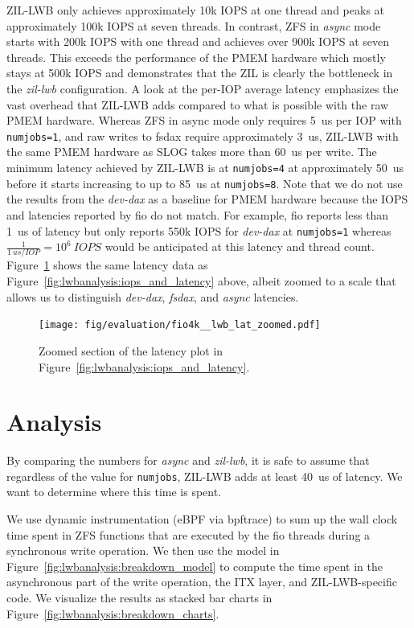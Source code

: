 \documentclass[12pt,a4paper,twoside]{book}
\begin{document}
ZIL-LWB only achieves approximately 10k IOPS at one thread and peaks at approximately 100k IOPS at seven threads.
In contrast, ZFS in \textit{async} mode starts with 200k IOPS with one thread and achieves over 900k IOPS at seven threads.
This exceeds the performance of the PMEM hardware which mostly stays at 500k IOPS and demonstrates that the ZIL is clearly the bottleneck in the \textit{zil-lwb} configuration.
A look at the per-IOP average latency emphasizes the vast overhead that ZIL-LWB adds compared to what is possible with the raw PMEM hardware.
Whereas ZFS in async mode only requires 5~us per IOP with \lstinline{numjobs=1}, and raw writes to fsdax require approximately 3~us, ZIL-LWB with the same PMEM hardware as SLOG takes more than 60~us per write.
The minimum latency achieved by ZIL-LWB is at \lstinline{numjobs=4} at approximately 50~us before it starts increasing to up to 85~us at \lstinline{numjobs=8}.
Note that we do not use the results from the \textit{dev-dax} as a baseline for PMEM hardware because the IOPS and latencies reported by fio do not match.
For example, fio reports less than 1~us of latency but only reports 550k IOPS for \textit{dev-dax} at \lstinline{numjobs=1} whereas $\frac{1}{1~us/IOP} = 10^6~\si{IOPS}$ would be anticipated at this latency and thread count.
Figure~\ref{fig:lwbanalysis:zoomed_latency} shows the same latency data as Figure~\ref{fig:lwbanalysis:iops_and_latency} above, albeit zoomed to a scale that allows us to distinguish \textit{dev-dax}, \textit{fsdax}, and \textit{async} latencies.

\begin{figure}[H]
    \centering
    \texttt{[image: fig/evaluation/fio4k\_\_lwb\_lat\_zoomed.pdf]}
    \caption{Zoomed section of the latency plot in Figure~\ref{fig:lwbanalysis:iops_and_latency}.}
    \label{fig:lwbanalysis:zoomed_latency}
\end{figure}

\section{Analysis}\label{ch:lwb_analysis:breakdown}

By comparing the numbers for \textit{async} and \textit{zil-lwb}, it is safe to assume that regardless of the value for \lstinline{numjobs}, ZIL-LWB adds at least 40~us of latency.
We want to determine where this time is spent.

We use dynamic instrumentation (eBPF via bpftrace) to sum up the wall clock time spent in ZFS functions that are executed by the fio threads during a synchronous write operation.
We then use the model in Figure~\ref{fig:lwbanalysis:breakdown_model} to compute the time spent in the asynchronous part of the write operation, the ITX layer, and ZIL-LWB-specific code.
We visualize the results as stacked bar charts in Figure~\ref{fig:lwbanalysis:breakdown_charts}.
\end{document}
